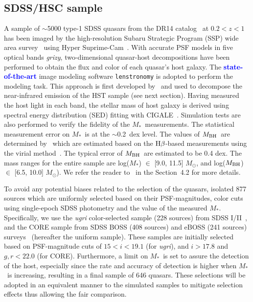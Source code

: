 \documentclass[twocolumn]{aastex631}
\newcommand{\blue}[1]{\textcolor{blue}{\bf #1}}
\def\smass{{$M_*$}}
\def\hbeta{${\rm H}\beta$}
\def\mbh{$M_{\rm BH}$}
\begin{document}
\subsection{SDSS/HSC sample}\label{sec:hsc}
A sample of $\sim$5000 type-1 SDSS quasars from the DR14 catalog~\citep{Paris2018} at $0.2<z<1$ has been imaged by the high-resolution Subaru Strategic Program (SSP) wide area survey~\citep{Aihara2019} using Hyper Suprime-Cam~\citep{Miyazaki2018}. With accurate PSF models in five optical bands {\it grizy}, two-dimensional quasar-host decompositions have been performed \citep[][]{Li2021a} to obtain the flux and color of each quasar's host galaxy. The \blue{state-of-the-art} image modeling software {\tt lenstronomy} \citep{Birrer2015, Birrer2018, Birrer2021} is adopted to perform the modeling task. This approach is first developed by~\citet{Ding2020} and used to decompose the near-infrared emission of the HST sample (see next section). Having measured the host light in each band, the stellar mass of host galaxy is derived using spectral energy distribution (SED) fitting with CIGALE~\citep{Boquien2019}. Simulation tests are also performed to verify the fidelity of the \smass\ measurements. The statistical measurement error on \smass\ is at the $\sim$0.2~dex level. The values of \mbh\ are determined by~\citet{Rakshit2020} which are estimated based on the \hbeta-based measurements using the virial method~\citep{Peterson2004, Vestergaard2006}. The typical error of \mbh\ are estimated to be 0.4 dex. The mass ranges for the entire sample are log(\smass) $\in$ [9.0, 11.5] $M_{\odot}$, and log(\mbh) $\in$  [6.5, 10.0] $M_{\odot}$).
 We refer the reader to~\citet{Li2021a} in the Section~4.2 for more details.

To avoid any potential biases related to the selection of the quasars, \citet{Li2021b} isolated 877 sources which are uniformly selected based on their PSF-magnitudes, color cuts using single-epoch SDSS photometry and the value of the measured \smass. Specifically, we use the {\it ugri} color-selected sample (228 sources) from SDSS I/II~\citep{Richards2002}, and the CORE sample from SDSS BOSS (408 sources) and eBOSS (241 sources) surveys~\citep{Ross2013, Myers2015} (hereafter the uniform sample). These samples are initially selected based on PSF-magnitude cuts of $15 < i < 19.1$ (for {\it ugri}), and $i > 17.8$ and $g, r < 22.0$ (for CORE). Furthermore, a limit on \smass\ is set to assure the detection of the host, especially since the rate and accuracy of detection is higher when \smass\ is increasing, resulting in a final sample of 646 quasars. These selections will be adopted in an equivalent manner to the simulated samples to mitigate selection effects thus allowing the fair comparison.
\end{document}
